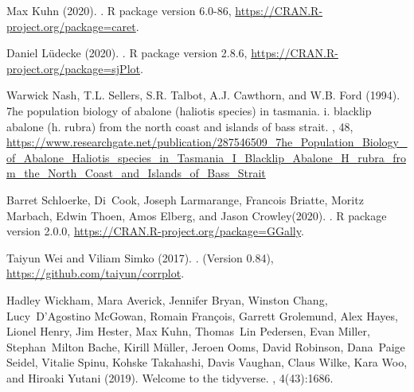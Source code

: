 \documentclass[letterpaper,9pt,twocolumn,twoside,]{pinp}
\begin{document}
\begin{thebibliography}{3}
Max Kuhn (2020).
.
\newblock R package version 6.0-86, \urlprefix \url{https://CRAN.R-project.org/package=caret}.

Daniel Lüdecke (2020).
.
\newblock R package version 2.8.6, \urlprefix \url{https://CRAN.R-project.org/package=sjPlot}.

Warwick Nash, T.L. Sellers, S.R. Talbot, A.J. Cawthorn, and W.B. Ford (1994).
\newblock 7he population biology of abalone (haliotis species) in tasmania.
  i. blacklip abalone (h. rubra) from the north coast and islands of bass
  strait.
, 48, \urlprefix \url{https://www.researchgate.net/publication/287546509_7he_Population_Biology_of_Abalone_Haliotis_species_in_Tasmania_I_Blacklip_Abalone_H_rubra_from_the_North_Coast_and_Islands_of_Bass_Strait}

Barret Schloerke, Di~Cook, Joseph Larmarange, Francois Briatte, Moritz Marbach,
  Edwin Thoen, Amos Elberg, and Jason Crowley(2020).
.
\newblock R package version 2.0.0, \urlprefix \url{https://CRAN.R-project.org/package=GGally}.

Taiyun Wei and Viliam Simko (2017).
.
\newblock (Version 0.84), \urlprefix \url{https://github.com/taiyun/corrplot}.

Hadley Wickham, Mara Averick, Jennifer Bryan, Winston Chang, Lucy~D'Agostino
  McGowan, Romain François, Garrett Grolemund, Alex Hayes, Lionel Henry, Jim
  Hester, Max Kuhn, Thomas~Lin Pedersen, Evan Miller, Stephan~Milton Bache,
  Kirill Müller, Jeroen Ooms, David Robinson, Dana~Paige Seidel, Vitalie
  Spinu, Kohske Takahashi, Davis Vaughan, Claus Wilke, Kara Woo, and Hiroaki
  Yutani (2019).
\newblock Welcome to the {tidyverse}.
, 4(43):1686.

\end{thebibliography}
\end{document}
